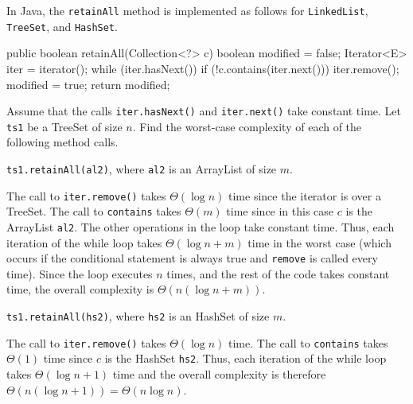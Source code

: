 \begin{exa}\label{exa:retainAllOthers}
In Java, the \verb+retainAll+ method is implemented as follows for
\verb+LinkedList+, \verb+TreeSet+, and \verb+HashSet+.
\begin{code}
    public boolean retainAll(Collection<?> c) {
        boolean modified = false;
        Iterator<E> iter = iterator();
        while (iter.hasNext()) {
            if (!c.contains(iter.next())) {
                iter.remove();
                modified = true;
            }
        }
        return modified;
    }
\end{code}
Assume that the calls \verb+iter.hasNext()+ and \verb+iter.next()+
take constant time.  
Let \verb+ts1+ be a TreeSet of size $n$. 
Find the worst-case complexity of each of the following method calls.

\begin{lenum}
\item
\verb+ts1.retainAll(al2)+, where \verb+al2+ is an ArrayList of size $m$.
\begin{sol}
The call to \verb+iter.remove()+ takes $\Theta(\log n)$ time since the iterator
is over a TreeSet.  The call to \verb+contains+ takes $\Theta(m)$ time since in this
case $c$ is the ArrayList \verb+al2+.   The other operations in the loop take constant time.
Thus, each iteration of the while loop takes $\Theta(\log n+m)$ time in the worst case
(which occurs if the conditional statement is always true and \verb+remove+ is called
every time). 
Since the
loop executes $n$ times, and the rest of the code takes constant time, 
the overall complexity is $\Theta(n(\log n + m))$.
\end{sol}
\item
\verb+ts1.retainAll(hs2)+, where \verb+hs2+ is an HashSet of size $m$.
\begin{sol}
The call to \verb+iter.remove()+ takes $\Theta(\log n)$ time.  
The call to \verb+contains+ takes $\Theta(1)$ time since $c$ is the HashSet \verb+hs2+.  
Thus, each iteration of the while loop takes $\Theta(\log n+1)$ time and the
overall complexity is therefore $\Theta(n(\log n + 1))=\Theta(n\log n)$.
\end{sol}
\end{lenum}
\end{exa}

